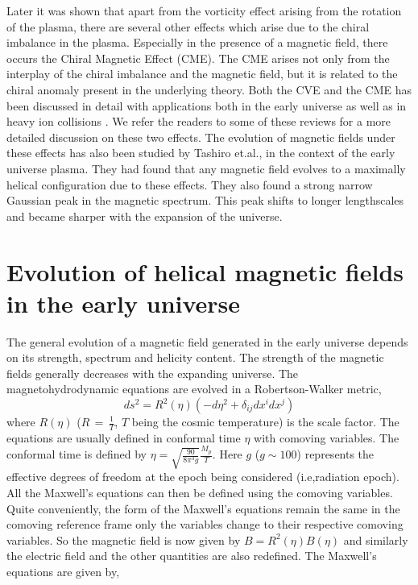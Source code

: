 \documentclass{ws-mpla}
\begin{document}
Later it was shown that apart from the vorticity effect arising from the rotation of the plasma, 
there are several other
effects which arise due to the chiral imbalance in the plasma. Especially in the presence of
a magnetic field, there occurs the Chiral Magnetic Effect (CME). The CME arises not 
only from the interplay of the chiral imbalance and the magnetic field, but it is related to the chiral anomaly present in the underlying theory. Both the CVE and 
the CME has been discussed in detail with applications 
both in the early universe as well as in heavy ion collisions \cite{son,kharzeev2,boyarsky}. We refer the readers to some of these reviews for a more detailed discussion on these two effects. 
The evolution of magnetic fields under these effects has also been studied by Tashiro et.al.,\cite{tashiro} in the context of the early universe plasma. They had found that any 
magnetic field evolves to a maximally helical configuration due to these effects. They also found a strong narrow Gaussian peak in the magnetic spectrum. This peak shifts to longer 
lengthscales and became sharper with the expansion of the universe. 




\section{Evolution of helical magnetic fields in the early universe}

The general evolution of a magnetic field generated in the early universe depends on its strength, spectrum and helicity content. The strength of the magnetic fields 
generally decreases with the expanding universe. The magnetohydrodynamic equations are evolved in a Robertson-Walker metric, 
\begin{equation}
 ds^2 = R^2(\eta) (-d\eta^2 + \delta_{ij} dx^{i} dx^{j})
\end{equation}
where $R(\eta)$ ($R \, = \, \frac{1}{T}$, $T$ being the cosmic temperature) is the scale factor. The equations are usually defined in conformal time $\eta $ with comoving variables. The conformal time is defined by 
$\eta = \sqrt{\frac{90}{8 \pi^3 g}} \frac{M_p}{T}$. Here $g$ ($g \sim 100$)
 represents the effective degrees of freedom at the epoch being considered (i.e,radiation epoch). All the Maxwell's equations can then be 
defined using the comoving variables. Quite conveniently, the form of the Maxwell's equations remain the same in the
comoving reference frame only the variables change to their respective comoving variables. So the magnetic field is now given by $B = R^2(\eta)B(\eta)$ and similarly 
the electric field and the other quantities are also redefined. The Maxwell's equations are given by,   
\end{document}
